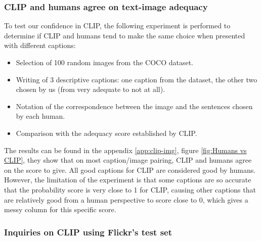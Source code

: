 \documentclass{article}
\begin{document}
\begin{multicols}{2}
\subsubsection{CLIP and humans agree on text-image adequacy}



To test our confidence in CLIP, the following experiment is performed to determine if CLIP and humans tend to make the same choice when presented with different captions: 
\begin{itemize}
  \item Selection of 100 random images from the COCO dataset.
  \item Writing of 3 descriptive captions: one caption from the dataset, the other two chosen by us (from very adequate to not at all).
  \item Notation of the correspondence between the image and the sentences chosen by each human.
  \item Comparison with the adequacy score established by CLIP.
\end{itemize}

The results can be found in the appendix \ref{app:clip-img}, figure \ref{fig:Humans vs CLIP}, they show that on most caption/image pairing, CLIP and humans agree on the score to give. All good captions for CLIP are considered good by humans. However, the limitation of the experiment is that some captions are so accurate that the probability score is very close to 1 for CLIP, causing other captions that are relatively good from a human perspective to score close to 0, which gives a messy column for this specific score.

\subsubsection{Inquiries on CLIP using Flickr's test set}




\end{multicols}
\end{document}
